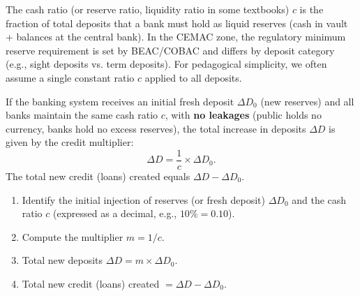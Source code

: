 \documentclass[11pt]{article}
\newcommand{\cle}[1]{{\popxbold\color{popdark}#1}}
\begin{document}
\begin{propriete}
The \cle{cash ratio} (or \cle{reserve ratio}, \cle{liquidity ratio} in some textbooks) $c$ is the fraction of total deposits that a bank must hold as liquid reserves (cash in vault + balances at the central bank). In the CEMAC zone, the regulatory minimum reserve requirement is set by BEAC/COBAC and differs by deposit category (e.g., sight deposits vs. term deposits). For pedagogical simplicity, we often assume a single constant ratio $c$ applied to all deposits.
\end{propriete}

\begin{propriete}
If the banking system receives an initial fresh deposit $\Delta D_0$ (new reserves) and all banks maintain the same cash ratio $c$, with \textbf{no leakages} (public holds no currency, banks hold no excess reserves), the total increase in deposits $\Delta D$ is given by the \cle{credit multiplier}:
\[
\Delta D = \frac{1}{c} \times \Delta D_0.
\]
The total new credit (loans) created equals $\Delta D - \Delta D_0$.
\end{propriete}

\begin{methode}
\begin{enumerate}
\item Identify the initial injection of reserves (or fresh deposit) $\Delta D_0$ and the cash ratio $c$ (expressed as a decimal, e.g., $10\% = 0.10$).
\item Compute the multiplier $m = 1/c$.
\item Total new deposits $\Delta D = m \times \Delta D_0$.
\item Total new credit (loans) created $= \Delta D - \Delta D_0$.
\end{enumerate}
\end{methode}
\end{document}
